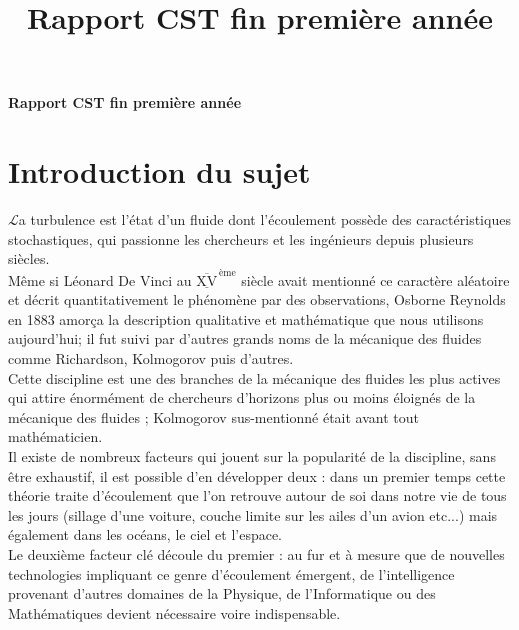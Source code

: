 \documentclass[a4paper,12pt]{article}
\title{\navy \textbf{Rapport CST fin première année} \color{black}}%
\date{}
\newcommand\bk{\color{black}}
\newcommand\navy{\color{navy}}
\numberwithin{equation}{section} %
\begin{document}
\begin{titlepage} \centering
\vspace*{\fill}
\Huge \navy \textbf{Rapport CST fin première année} \bk \normalsize
\vspace*{\fill}
\end{titlepage}
\newpage

\navy \section{Introduction du sujet}  \bk
\Large{$\mathscr{L}$}\normalsize a turbulence est l'état d'un fluide dont l'écoulement possède des caractéristiques stochastiques, qui passionne les chercheurs et les ingénieurs depuis plusieurs siècles.\\ 
Même si Léonard De Vinci au $\overline{\underline{\text{XV}}}^{\, \text{ème}}$ siècle avait mentionné ce caractère aléatoire et décrit quantitativement le phénomène par des observations, Osborne Reynolds en 1883 amorça la description qualitative et mathématique que nous utilisons aujourd'hui; il fut suivi par d'autres grands noms de la mécanique des fluides comme Richardson, Kolmogorov puis d'autres. \\

\noindent Cette discipline est une des branches de la mécanique des fluides les plus actives qui attire énormément de chercheurs d'horizons plus ou moins éloignés de la mécanique des fluides ; Kolmogorov sus-mentionné était avant tout mathématicien.\\
Il existe de nombreux facteurs qui jouent sur la popularité de la discipline, sans être exhaustif, il est possible d'en développer deux : dans un premier temps cette théorie traite d'écoulement que l'on retrouve autour de soi dans notre vie de tous les jours (sillage d'une voiture, couche limite sur les ailes d'un avion etc...) mais également dans les océans, le ciel et l'espace. \\
Le deuxième facteur clé découle du premier : au fur et à mesure que de nouvelles technologies impliquant ce genre d'écoulement émergent, de l'intelligence provenant d'autres domaines de la Physique, de l'Informatique ou des Mathématiques devient nécessaire voire indispensable. \\
\end{document}
